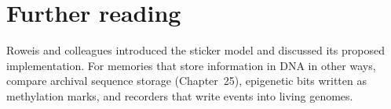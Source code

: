 \section*{Further reading}
Roweis and colleagues introduced the sticker model and discussed its proposed
implementation.\cite{Roweis1998} For memories that store information in DNA in
other ways, compare archival sequence storage (Chapter~25),\cite{Goldman2013}
epigenetic bits written as methylation marks,\cite{ZhangC2024} and recorders
that write events into living genomes.\cite{Shipman2017,Choi2022}
